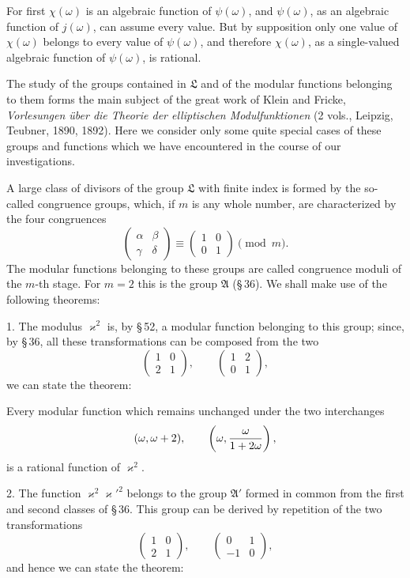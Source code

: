 \documentclass[11pt]{article}
\begin{document}
For first $\chi(\omega)$ is an algebraic function of $\psi(\omega)$, and $\psi(\omega)$, as an algebraic function of $j(\omega)$, can assume every value. But by supposition only one value of $\chi(\omega)$ belongs to every value of $\psi(\omega)$, and therefore $\chi(\omega)$, as a single-valued algebraic function of $\psi(\omega)$, is rational.

The study of the groups contained in $\mathfrak L$ and of the modular functions belonging to them forms the main subject of the great work of Klein and Fricke, \emph{Vorlesungen \"uber die Theorie der elliptischen Modulfunktionen} (2 vols., Leipzig, Teubner, 1890, 1892). Here we consider only some quite special cases of these groups and functions which we have encountered in the course of our investigations.

A large class of divisors of the group $\mathfrak L$ with finite index is formed by the so-called congruence groups, which, if $m$ is any whole number, are characterized by the four congruences
\[
\begin{pmatrix}\alpha&\beta\\ \gamma&\delta\end{pmatrix}
\equiv
\begin{pmatrix}1&0\\0&1\end{pmatrix}
\pmod m.
\]
The modular functions belonging to these groups are called congruence moduli of the $m$-th stage. For $m=2$ this is the group $\mathfrak A$ (\S\,36). We shall make use of the following theorems:

1. The modulus $\varkappa^2$ is, by \S\,52, a modular function belonging to this group; since, by \S\,36, all these transformations can be composed from the two
\[
\begin{pmatrix}1&0\\2&1\end{pmatrix},
\qquad
\begin{pmatrix}1&2\\0&1\end{pmatrix},
\]
we can state the theorem:

Every modular function which remains unchanged under the two interchanges
\[
(\omega,\omega+2),
\qquad
\left(\omega,{\omega\over1+2\omega}\right),
\]
is a rational function of $\varkappa^2$.

2. The function $\varkappa^2\varkappa'^2$ belongs to the group $\mathfrak A'$ formed in common from the first and second classes of \S\,36. This group can be derived by repetition of the two transformations
\[
\begin{pmatrix}1&0\\2&1\end{pmatrix},
\qquad
\begin{pmatrix}0&1\\-1&0\end{pmatrix},
\]
and hence we can state the theorem:
\end{document}
